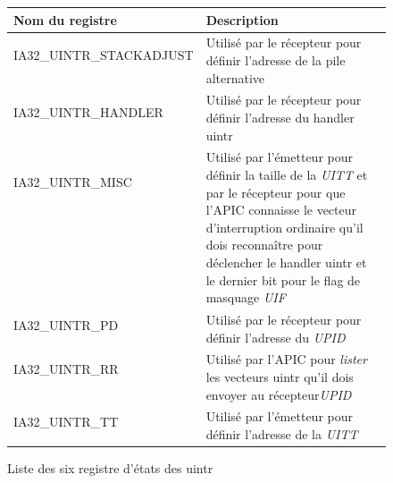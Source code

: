 \begin{figure}[H]
  \begin{tabular}{|l|l| }
    \hline
    \bf Nom du registre & \bf Description\\
    \hline
    IA32_UINTR_STACKADJUST & \multirow{2}{0.5\textwidth}{Utilisé par le récepteur pour définir l'adresse de la pile alternative}\\ %
    &\\
    \hline
    IA32_UINTR_HANDLER & \multirow{2}{0.5\textwidth}{Utilisé par le récepteur pour définir l'adresse du handler uintr}\\
    &\\
    \hline
    IA32_UINTR_MISC & \multirow{7}{0.5\textwidth}{Utilisé par l'émetteur pour définir la taille de la \emph{UITT} et
    par le récepteur pour que l'APIC connaisse le vecteur d'interruption ordinaire qu'il dois reconnaître pour déclencher le handler uintr
    et le dernier bit pour le flag de masquage \emph{UIF}}\\
    &\\
    &\\
    &\\
    &\\
    &\\
    &\\
    \hline
    IA32_UINTR_PD & \multirow{2}{0.5\textwidth}{Utilisé par le récepteur pour définir l'adresse du \emph{UPID}}\\
    &\\
    \hline
    IA32_UINTR_RR & \multirow{3}{0.5\textwidth}{Utilisé par l'APIC pour \textit{lister} les vecteurs uintr qu'il dois envoyer au récepteur\emph{UPID}}\\
    &\\
    &\\
    \hline
    IA32_UINTR_TT & \multirow{2}{0.5\textwidth}{Utilisé par l'émetteur pour définir l'adresse de la \emph{UITT}}\\
    &\\
    \hline
  \end{tabular}
  \caption{Liste des six registre d'états des uintr}
  \label{tab:uintrStateRegisters}
\end{figure}


